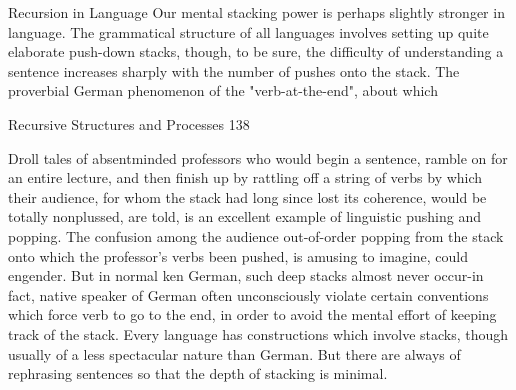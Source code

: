                                Recursion in Language
Our mental stacking power is perhaps slightly stronger in language. The grammatical
structure of all languages involves setting up quite elaborate push-down stacks, though, to
be sure, the difficulty of understanding a sentence increases sharply with the number of
pushes onto the stack. The proverbial German phenomenon of the "verb-at-the-end",
about which




Recursive Structures and Processes                                                      138

       Droll tales of absentminded professors who would begin a sentence, ramble on for
an entire lecture, and then finish up by rattling off a string of verbs by which their
audience, for whom the stack had long since lost its coherence, would be totally
nonplussed, are told, is an excellent example of linguistic pushing and popping. The
confusion among the audience out-of-order popping from the stack onto which the
professor's verbs been pushed, is amusing to imagine, could engender. But in normal ken
German, such deep stacks almost never occur-in fact, native speaker of German often
unconsciously violate certain conventions which force verb to go to the end, in order to
avoid the mental effort of keeping track of the stack. Every language has constructions
which involve stacks, though usually of a less spectacular nature than German. But there
are always of rephrasing sentences so that the depth of stacking is minimal.

